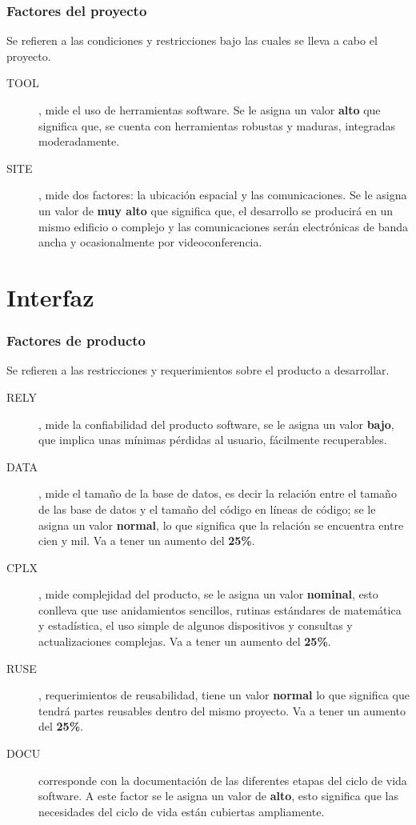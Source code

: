 \documentclass[11pt,a4paper,spanish,twoside]{book}
\begin{document}
\subsubsection{Factores del proyecto}
Se refieren a las condiciones y restricciones bajo las cuales se lleva a cabo
el proyecto.
\begin{description}
\item[TOOL], mide el uso de herramientas software. Se le asigna un valor
\textbf{alto} que significa que, se cuenta con herramientas robustas y
maduras, integradas moderadamente.
\item[SITE], mide dos factores: la ubicación espacial y las comunicaciones.
Se le asigna un valor de \textbf{muy alto} que significa que, el desarrollo
se producirá en un mismo edificio o complejo y las comunicaciones serán
electrónicas de banda ancha y ocasionalmente por videoconferencia.
\end{description}

\section{Interfaz}
\subsubsection{Factores de producto}
Se refieren a las restricciones y requerimientos sobre el producto a
desarrollar.
\begin{description}
\item[RELY], mide la confiabilidad del producto software, se le asigna un 
valor \textbf{bajo}, que implica unas mínimas pérdidas al usuario,
fácilmente recuperables.

\item[DATA], mide el tamaño de la base de datos, es decir la relación entre
el tamaño de las base de datos y el tamaño del código en líneas de código; se
le asigna un valor \textbf{normal}, lo que significa que la relación se encuentra entre cien y mil. Va a tener un aumento del \textbf{25\%}.

\item[CPLX], mide complejidad del producto, se le asigna un
valor \textbf{nominal}, esto conlleva que use anidamientos sencillos, rutinas
estándares de matemática y estadística, el uso simple de algunos dispositivos
y consultas y actualizaciones complejas. Va a tener un aumento del 
\textbf{25\%}.

\item[RUSE], requerimientos de reusabilidad, tiene un valor \textbf{normal}
lo que significa que tendrá partes reusables dentro del mismo
proyecto. Va a tener un aumento del \textbf{25\%}.

\item[DOCU] corresponde con la documentación de las diferentes etapas del
ciclo de vida software. A este factor se le asigna un valor de \textbf{alto},
esto significa que las necesidades del ciclo de vida están cubiertas
ampliamente.

\end{description}
\end{document}
